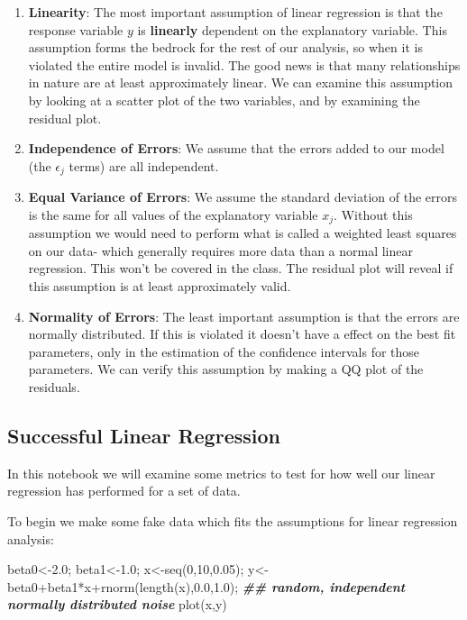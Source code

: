\documentclass[
]{book}
\newenvironment{Shaded}{\begin{snugshade}}{\end{snugshade}}
\newcommand{\DecValTok}[1]{\textcolor[rgb]{0.00,0.00,0.81}{#1}}
\newcommand{\DocumentationTok}[1]{\textcolor[rgb]{0.56,0.35,0.01}{\textbf{\textit{#1}}}}
\newcommand{\FloatTok}[1]{\textcolor[rgb]{0.00,0.00,0.81}{#1}}
\newcommand{\FunctionTok}[1]{\textcolor[rgb]{0.00,0.00,0.00}{#1}}
\newcommand{\NormalTok}[1]{#1}
\newcommand{\OtherTok}[1]{\textcolor[rgb]{0.56,0.35,0.01}{#1}}
\newcommand{\SpecialCharTok}[1]{\textcolor[rgb]{0.00,0.00,0.00}{#1}}
\theoremstyle{definition}
\theoremstyle{definition}
\theoremstyle{definition}
\theoremstyle{definition}
\theoremstyle{remark}
\begin{document}
\begin{enumerate}
\def\labelenumi{\arabic{enumi}.}
\item
  \textbf{Linearity}: The most important assumption of linear regression is that the response variable \(y\) is \textbf{linearly} dependent on the explanatory variable. This assumption forms the bedrock for the rest of our analysis, so when it is violated the entire model is invalid. The good news is that many relationships in nature are at least approximately linear. We can examine this assumption by looking at a scatter plot of the two variables, and by examining the residual plot.
\item
  \textbf{Independence of Errors}: We assume that the errors added to our model (the \(\epsilon_j\) terms) are all independent.
\item
  \textbf{Equal Variance of Errors}: We assume the standard deviation of the errors is the same for all values of the explanatory variable \(x_j\). Without this assumption we would need to perform what is called a weighted least squares on our data- which generally requires more data than a normal linear regression. This won't be covered in the class. The residual plot will reveal if this assumption is at least approximately valid.
\item
  \textbf{Normality of Errors}: The least important assumption is that the errors are normally distributed. If this is violated it doesn't have a effect on the best fit parameters, only in the estimation of the confidence intervals for those parameters. We can verify this assumption by making a QQ plot of the residuals.
\end{enumerate}

\hypertarget{successful-linear-regression}{%
\subsection{Successful Linear Regression}\label{successful-linear-regression}}

In this notebook we will examine some metrics to test for how well our linear regression has performed for a set of data.

To begin we make some fake data which fits the assumptions for linear regression analysis:

\begin{Shaded}
\begin{Highlighting}[]
\NormalTok{beta0}\OtherTok{\textless{}{-}}\FloatTok{2.0}\NormalTok{;}
\NormalTok{beta1}\OtherTok{\textless{}{-}}\FloatTok{1.0}\NormalTok{;}
\NormalTok{x}\OtherTok{\textless{}{-}}\FunctionTok{seq}\NormalTok{(}\DecValTok{0}\NormalTok{,}\DecValTok{10}\NormalTok{,}\FloatTok{0.05}\NormalTok{);}
\NormalTok{y}\OtherTok{\textless{}{-}}\NormalTok{beta0}\SpecialCharTok{+}\NormalTok{beta1}\SpecialCharTok{*}\NormalTok{x}\SpecialCharTok{+}\FunctionTok{rnorm}\NormalTok{(}\FunctionTok{length}\NormalTok{(x),}\FloatTok{0.0}\NormalTok{,}\FloatTok{1.0}\NormalTok{); }\DocumentationTok{\#\# random, independent normally distributed noise}
\FunctionTok{plot}\NormalTok{(x,y)}
\end{Highlighting}
\end{Shaded}
\end{document}
